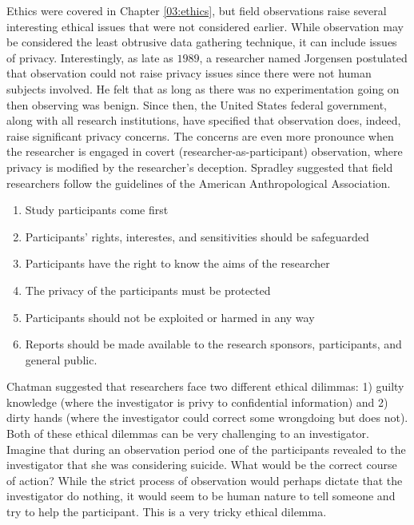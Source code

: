 Ethics were covered in Chapter \ref{03:ethics}, but field observations raise several interesting ethical issues that were not considered earlier. While observation may be considered the least obtrusive data gathering technique, it can include issues of privacy. Interestingly, as late as $ 1989 $, a researcher named Jorgensen postulated that observation could not raise privacy issues since there were not human subjects involved. He felt that as long as there was no experimentation going on then observing was benign. Since then, the United States federal government, along with all research institutions, have specified that observation does, indeed, raise significant privacy concerns. The concerns are even more pronounce when the researcher is engaged in covert (researcher-as-participant) observation, where privacy is modified by the researcher's deception. Spradley\cite{spradley2016p} suggested that field researchers follow the guidelines of the American Anthropological Association.

\begin{enumerate}
	\item Study participants come first
	\item Participants' rights, interestes, and sensitivities should be safeguarded
	\item Participants have the right to know the aims of the researcher
	\item The privacy of the participants must be protected
	\item Participants should not be exploited or harmed in any way
	\item Reports should be made available to the research sponsors, participants, and general public.
\end{enumerate}

Chatman\cite{chatman1992information} suggested that researchers face two different ethical dilimmas: 1) guilty knowledge (where the investigator is privy to confidential information) and 2) dirty hands (where the investigator could correct some wrongdoing but does not). Both of these ethical dilemmas can be very challenging to an investigator. Imagine that during an observation period one of the participants revealed to the investigator that she was considering suicide. What would be the correct course of action? While the strict process of observation would perhaps dictate that the investigator do nothing, it would seem to be human nature to tell someone and try to help the participant. This is a very tricky ethical dilemma.

